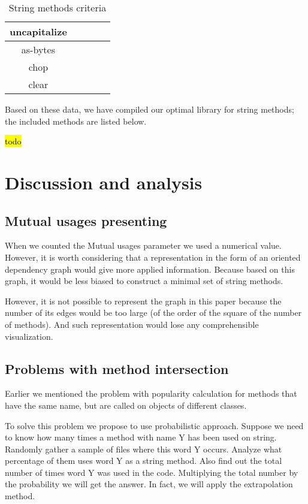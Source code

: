 \documentclass[anonymous,sigplan,review,11pt,nonacm,natbib=false]{acmart}
\begin{document}
\begin{table*}[]
\begin{tabular}{|c||c|c|c|c|}
        uncapitalize &  &  &  & \\ \hline

        as-bytes &  &  &  & \\ \hline

        chop &  &  &  & \\ \hline

        clear &  &  &  & \\ \hline

    \end{tabular}
    \caption{String methods criteria}
    \label{tab:my_label}
\end{table*}

Based on these data, we have compiled our optimal library for string methods; the included methods are listed below.

\hl{todo}

\section{Discussion and analysis}

\subsection{Mutual usages presenting}

When we counted the Mutual usages parameter we used a numerical value. However, it is worth considering that a representation in the form of an oriented dependency graph would give more applied information. Because based on this graph, it would be less biased to construct a minimal set of string methods.

However, it is not possible to represent the graph in this paper because the number of its edges would be too large (of the order of the square of the number of methods). And such representation would lose any comprehensible visualization.

\subsection{Problems with method intersection}

Earlier we mentioned the problem with popularity calculation for methods that have the same name, but are called on objects of different classes.

To solve this problem we propose to use probabilistic approach. Suppose we need to know how many times a method with name Y has been used on string. Randomly gather a sample of files where this word Y occurs. Analyze what percentage of them uses word Y as a string method. Also find out the total number of times word Y was used in the code. Multiplying the total number by the probability we will get the answer. 
In fact, we will apply the extrapolation method.
\end{document}
